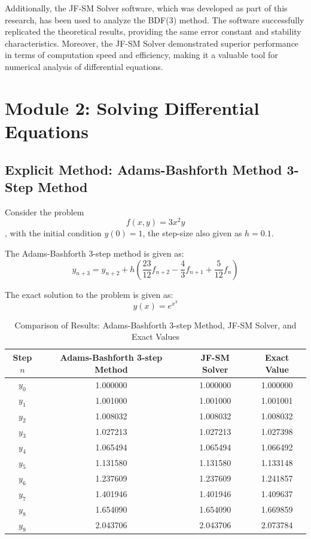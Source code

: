 Additionally, the JF-SM Solver software, which was developed as part of this research, has been used to analyze the BDF(3) method. The software successfully replicated the theoretical results, providing the same error constant and stability characteristics. Moreover, the JF-SM Solver demonstrated superior performance in terms of computation speed and efficiency, making it a valuable tool for numerical analysis of differential equations.



\section{Module 2: Solving Differential Equations}

\subsection{Explicit Method: Adams-Bashforth Method 3-Step Method}
Consider the problem \begin{equation}
    f(x,y) = 3x^2y
\end{equation}, with the initial condition $y(0) = 1$, the step-size also given as $h = 0.1$.

The Adams-Bashforth 3-step method is given as:
\begin{equation}
    y_{n+3}  = y_{n+2} + h \left(\frac{23}{12}f_{n+2} - \frac{4}{3}f_{n+1} + \frac{5}{12}f_{n}\right)
\end{equation}

The exact solution to the problem is given as:
\begin{equation}
    y(x) = e^{x^3}
\end{equation}




\begin{table}[htbp]
    \centering
    \begin{tabular}{|c|c|c|c|}
        \hline
        Step $n$ & Adams-Bashforth 3-step Method & JF-SM Solver & Exact Value \\
        \hline
        $y_0$ & 1.000000 & 1.000000 & 1.000000 \\
        $y_1$ & 1.001000 & 1.001000 & 1.001001 \\
        $y_2$ & 1.008032 & 1.008032 & 1.008032 \\
        $y_3$ & 1.027213 & 1.027213 & 1.027398 \\
        $y_4$ & 1.065494 & 1.065494 & 1.066492 \\
        $y_5$ & 1.131580 & 1.131580 & 1.133148 \\
        $y_6$ & 1.237609 & 1.237609 & 1.241857 \\
        $y_7$ & 1.401946 & 1.401946 & 1.409637 \\
        $y_8$ & 1.654090 & 1.654090 & 1.669859 \\
        $y_9$ & 2.043706 & 2.043706 & 2.073784 \\
        \hline
    \end{tabular}
    \caption{Comparison of Results: Adams-Bashforth 3-step Method, JF-SM Solver, and Exact Values}
    \label{tab:comparison}
\end{table}


